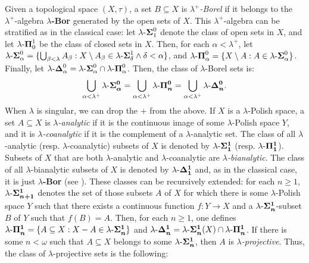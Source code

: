 \documentclass{amsart}
\numberwithin{equation}{section}
\def\hyp{{\hbox{-}}}
\theoremstyle{definition}
\theoremstyle{remark}
\begin{document}
    Given a topological space $(X,\tau)$, a set $B\subseteq X$ is \emph{$\lambda^{+}$-Borel} if it belongs to the $\lambda^{+}$-algebra $\lambda$\textbf{-Bor} generated by the open sets of $X$. This $\lambda^+$-algebra can be stratified as in the classical case: let $\lambda\hyp\boldsymbol{\Sigma}^0_1$ denote the class of open sets in $X$, and let $\lambda\hyp\boldsymbol{\Pi}^1_0$ be the class of closed sets in $X$. Then, for each $\alpha<\lambda^+$, let $\lambda\hyp\boldsymbol{\Sigma}^0_\alpha=\{\bigcup_{\beta<\lambda}A_\beta:X\setminus  A_\beta\in\lambda\hyp\boldsymbol{\Sigma}^1_\delta\wedge \delta<\alpha\}$, and $\lambda\hyp\boldsymbol{\Pi}^0_\alpha=\{X\setminus A:A\in\lambda\hyp\boldsymbol{\Sigma}^0_\alpha\}$. Finally, let $\lambda\hyp\boldsymbol{\Delta}^0_\alpha=\lambda\hyp\boldsymbol{\Sigma}^0_\alpha\cap\lambda\hyp\boldsymbol{\Pi}^0_\alpha$. Then, the class of $\lambda$-Borel sets is:
    \begin{equation*}
	\bigcup_{\alpha<\lambda^+}\lambda\hyp\boldsymbol{\Sigma^0_\alpha}=\bigcup_{\alpha<\lambda^+}\lambda\hyp\boldsymbol{\Pi^0_n}=\bigcup_{\alpha<\lambda^+}\lambda\hyp\boldsymbol{\Delta^0_n}.
\end{equation*}
    When $\lambda$ is singular, we can drop the $+$ from the above. If $X$ is a $\lambda$-Polish space, a set $A\subseteq X$ is \emph{$\lambda$-analytic} if it is the continuous image of some $\lambda$-Polish space $Y$, and it is \emph{$\lambda$-coanalytic} if it is the complement of a $\lambda$-analytic set. The class of all $\lambda$-analytic (resp. $\lambda$-coanalytic) subsets of $X$ is denoted by $\lambda\hyp\boldsymbol{\Sigma^1_1}$ (resp. $\lambda\hyp\boldsymbol{\Pi^1_1}$). Subsets of $X$ that are both $\lambda$-analytic and $\lambda$-coanalytic are \emph{$\lambda$-bianalytic}. The class of all $\lambda$-bianalytic subsets of $X$ is denoted by $\lambda\hyp\boldsymbol{\Delta^1_1}$ and, as in the classical case, it is just $\lambda$\textbf{-Bor} (see {\cite[Theorem 5.3.5]{DMR}}). These classes can be recursively extended: for each $n\geq 1$,
    $\lambda\hyp\boldsymbol{\Sigma^1_{n+1}}$ denotes the set of those subsets $A$ of $X$ for which there is some $\lambda$-Polish space $Y$ such that there exists a continuous function $f:Y\longrightarrow X$ and a $\lambda\hyp\boldsymbol{\Sigma^1_n}$-subset $B$ of $Y$ such that $f(B)=A$. Then, for each $n\geq 1$, one defines $\lambda\hyp\boldsymbol{\Pi^1_n}=\{A\subseteq X:X-A\in\lambda\hyp\boldsymbol{\Sigma^1_n}\}$ and $\lambda\hyp\boldsymbol{\Delta^1_n}=\lambda\hyp\boldsymbol{\Sigma^1_n}(X)\cap\lambda\hyp\boldsymbol{\Pi^1_n}$. If there is some $n<\omega$ such that $A\subseteq X$ belongs to some $\lambda\hyp\boldsymbol{\Sigma^1_n}$, then $A$ is \emph{$\lambda$-projective}. Thus, the class of $\lambda$-projective sets is the following:
\end{document}
